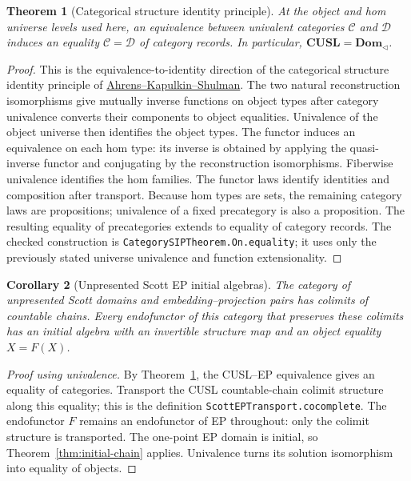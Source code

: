 \documentclass[11pt,a4paper]{article}
\newtheorem{theorem}{Theorem}[section]
\newtheorem{corollary}[theorem]{Corollary}
\theoremstyle{definition}
\theoremstyle{remark}
\begin{document}
\begin{theorem}[Categorical structure identity principle]
\label{thm:category-sip}
At the object and hom universe levels used here, an equivalence between
univalent categories $\mathcal C$ and $\mathcal D$ induces an equality
$\mathcal C=\mathcal D$ of category records. In particular,
$\mathbf{CUSL}=\mathbf{Dom}_{\triangleleft}$.
\end{theorem}
\begin{proof}
This is the equivalence-to-identity direction of the categorical
structure identity principle of
\href{https://arxiv.org/abs/1303.0584}{Ahrens--Kapulkin--Shulman}.
The two natural reconstruction isomorphisms give mutually inverse
functions on object types after category univalence converts their
components to object equalities. Univalence of the object universe then
identifies the object types. The functor induces an equivalence on each
hom type: its inverse is obtained by applying the quasi-inverse functor
and conjugating by the reconstruction isomorphisms. Fiberwise univalence
identifies the hom families. The functor laws identify identities and
composition after transport. Because hom types are sets, the remaining
category laws are propositions; univalence of a fixed precategory is
also a proposition. The resulting equality of precategories extends to
equality of category records. The checked construction is
\texttt{CategorySIPTheorem.On.equality}; it uses only the previously
stated universe univalence and function extensionality.
\end{proof}

\begin{corollary}[Unpresented Scott EP initial algebras]
\label{cor:ep-initial}
The category of unpresented Scott domains and embedding--projection pairs
has colimits of countable chains. Every endofunctor of this category that
preserves these colimits has an initial algebra with an invertible
structure map and an object equality $X=F(X)$.
\end{corollary}
\begin{proof}[Proof using univalence]
By Theorem~\ref{thm:category-sip}, the CUSL--EP equivalence gives an
equality of categories. Transport the CUSL countable-chain colimit
structure along this equality; this is the definition
\texttt{ScottEPTransport.cocomplete}. The endofunctor $F$ remains an
endofunctor of EP throughout: only the colimit structure is transported.
The one-point EP domain is initial, so
Theorem~\ref{thm:initial-chain} applies. Univalence turns its solution
isomorphism into equality of objects.
\end{proof}
\end{document}
